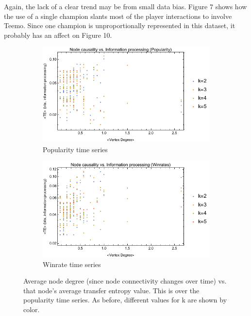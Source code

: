 \documentclass[twoside]{article}
\begin{document}
\begin{multicols}{2}
Again, the lack of a clear trend may be from small data bias. Figure 7 shows how the use of a single champion slants most of the player interactions to involve Teemo. Since one champion is unproportionally represented in this dataset, it probably has an affect on Figure 10.

\begin{figure}
\centering
\begin{subfigure}{.5\textwidth}
  \centering
  \includegraphics[width=1\linewidth]{popularity_degvsTE_prelim.pdf}
  \caption{Popularity time series}
  \label{fig:sub1}
\end{subfigure}%
\begin{subfigure}{.5\textwidth}
  \centering
  \includegraphics[width=1\linewidth]{winrate_degvsTE_prelim.pdf}
  \caption{Winrate time series}
  \label{fig:sub2}
\end{subfigure}
\caption{Average node degree (since node connectivity changes over time) vs. that node's average transfer entropy value. This is over the popularity time series. As before, different values for k are shown by color.}
\label{fig:test}
\end{figure}


\end{multicols}
\end{document}
